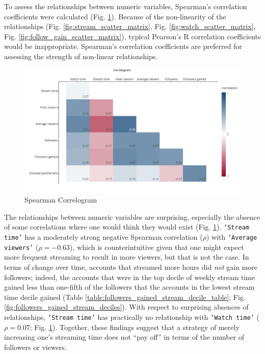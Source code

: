 \documentclass[12pt]{article}
\begin{document}
To assess the relationships between numeric variables, Spearman’s correlation coefficients were calculated (Fig. \ref{fig:spearman_correlogram}). Because of the non-linearity of the relationships (Fig. \ref{fig:stream_scatter_matrix}, Fig. \ref{fig:watch_scatter_matrix}, Fig. \ref{fig:follow_gain_scatter_matrix}), typical Pearson’s R correlation coefficients would be inappropriate. Spearman’s correlation coefficients are preferred for assessing the strength of non-linear relationships.
\begin{figure}[H]
  \centering %
  \includegraphics[width=\linewidth]{../StatCrunch_Results/spearman_correlogram}
  \captionsetup{justification=centering, singlelinecheck=false, margin=2cm}
  \caption[Spearman Correlogram]{Spearman Correlogram}
  \label{fig:spearman_correlogram}
\end{figure}

The relationships between numeric variables are surprising, especially the absence of some correlations where one would think they would exist (Fig. \ref{fig:spearman_correlogram}). \texttt{`Stream time’} has a moderately strong negative Spearman correlation ($\rho$) with \texttt{`Average viewers’} ($\rho = -0.63$), which is counterintuitive given that one might expect more frequent streaming to result in more viewers, but that is not the case. In terms of change over time, accounts that streamed more hours did \emph{not} gain more followers; indeed, the accounts that were in the top decile of weekly stream time gained less than one-fifth of the followers that the accounts in the lowest stream time decile gained (Table \ref{table:followers_gained_stream_decile_table}; Fig. \ref{fig:followers_gained_stream_deciles}).  With respect to surprising absences of relationships, \texttt{`Stream time’} has practically no relationship with \texttt{`Watch time’} ($\rho = 0.07$; Fig. \ref{fig:spearman_correlogram}). Together, these findings suggest that a strategy of merely increasing one’s streaming time does not “pay off” in terms of the number of followers or viewers.
\end{document}
